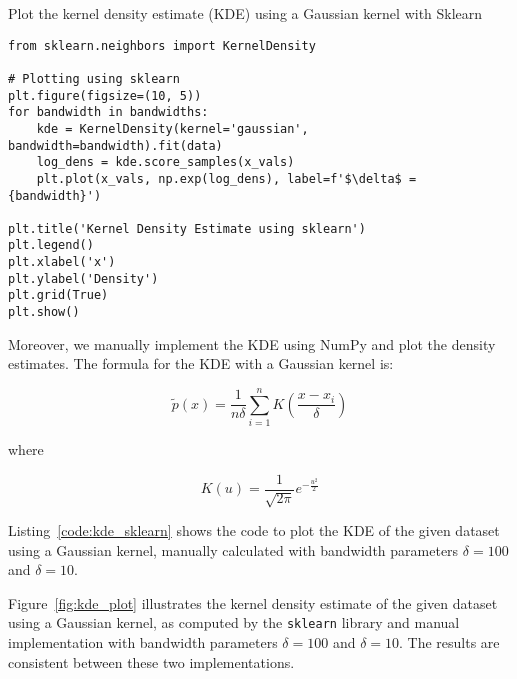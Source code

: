 \documentclass{article}
\begin{document}
\begin{listing}[H]
\caption{Plot the kernel density estimate (KDE) using a Gaussian kernel with Sklearn}
\label{code:kde_sklearn}
\begin{verbatim}
from sklearn.neighbors import KernelDensity

# Plotting using sklearn
plt.figure(figsize=(10, 5))
for bandwidth in bandwidths:
    kde = KernelDensity(kernel='gaussian', bandwidth=bandwidth).fit(data)
    log_dens = kde.score_samples(x_vals)
    plt.plot(x_vals, np.exp(log_dens), label=f'$\delta$ = {bandwidth}')

plt.title('Kernel Density Estimate using sklearn')
plt.legend()
plt.xlabel('x')
plt.ylabel('Density')
plt.grid(True)
plt.show()
\end{verbatim}
\end{listing}

Moreover, we manually implement the KDE using NumPy and plot the density estimates. The formula for the KDE with a Gaussian kernel is:

\[
\tilde{p}(x) = \frac{1}{n\delta} \sum_{i=1}^{n} K\left(\frac{x - x_i}{\delta}\right)
\]

where

\[
K(u) = \frac{1}{\sqrt{2\pi}} e^{-\frac{u^2}{2}}
\]


Listing~\ref{code:kde_sklearn} shows the code to plot the KDE of the given dataset using a Gaussian kernel, manually calculated with bandwidth parameters \( \delta = 100 \) and \( \delta = 10 \).

Figure~\ref{fig:kde_plot} illustrates the kernel density estimate of the given dataset using a Gaussian kernel, as computed by the \texttt{sklearn} library and manual implementation with bandwidth parameters \( \delta = 100 \) and \( \delta = 10 \). The results are consistent between these two implementations.
\end{document}
